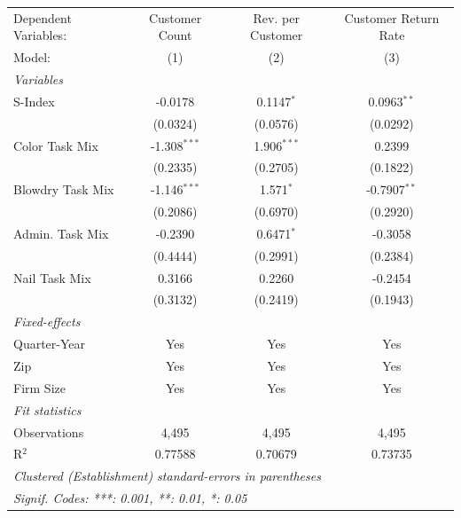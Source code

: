 
\begingroup
\centering
\begin{tabular}{lccc}
   \tabularnewline \midrule \midrule
   Dependent Variables: & Customer Count & Rev. per Customer & Customer Return Rate\\  
   Model:               & (1)            & (2)               & (3)\\  
   \midrule
   \emph{Variables}\\
   S-Index              & -0.0178        & 0.1147$^{*}$      & 0.0963$^{**}$\\   
                        & (0.0324)       & (0.0576)          & (0.0292)\\   
   Color Task Mix       & -1.308$^{***}$ & 1.906$^{***}$     & 0.2399\\   
                        & (0.2335)       & (0.2705)          & (0.1822)\\   
   Blowdry Task Mix     & -1.146$^{***}$ & 1.571$^{*}$       & -0.7907$^{**}$\\   
                        & (0.2086)       & (0.6970)          & (0.2920)\\   
   Admin. Task Mix      & -0.2390        & 0.6471$^{*}$      & -0.3058\\   
                        & (0.4444)       & (0.2991)          & (0.2384)\\   
   Nail Task Mix        & 0.3166         & 0.2260            & -0.2454\\   
                        & (0.3132)       & (0.2419)          & (0.1943)\\   
   \midrule
   \emph{Fixed-effects}\\
   Quarter-Year         & Yes            & Yes               & Yes\\  
   Zip                  & Yes            & Yes               & Yes\\  
   Firm Size            & Yes            & Yes               & Yes\\  
   \midrule
   \emph{Fit statistics}\\
   Observations         & 4,495          & 4,495             & 4,495\\  
   R$^2$                & 0.77588        & 0.70679           & 0.73735\\  
   \midrule \midrule
   \multicolumn{4}{l}{\emph{Clustered (Establishment) standard-errors in parentheses}}\\
   \multicolumn{4}{l}{\emph{Signif. Codes: ***: 0.001, **: 0.01, *: 0.05}}\\
\end{tabular}
\par\endgroup


